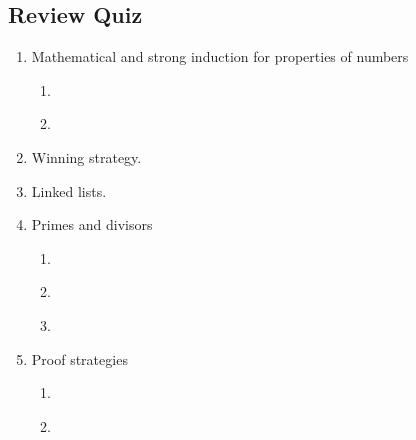 \newpage

\subsection*{Review Quiz}
\begin{enumerate}
    \item Mathematical and strong induction for properties of numbers
    \begin{enumerate}
        \item \hspace{1in} \\ 
        \item \hspace{1in} \\ 
    \end{enumerate}
    \item Winning strategy. 
    \item Linked lists. 
    \item Primes and divisors
    \begin{enumerate}
        \item \hspace{1in}\\ 
        \item \hspace{1in}\\ 
        \item \hspace{1in}\\ 
    \end{enumerate}
    \item Proof strategies
    \begin{enumerate}
        \item \hspace{1in}\\ 
        \item \hspace{1in}\\ 
    \end{enumerate}
\end{enumerate}

